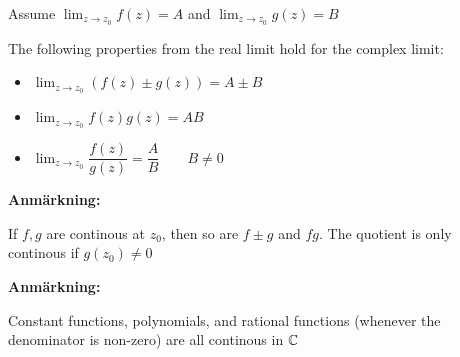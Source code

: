\par\bigskip
\noindent Assume $\lim_{z\to z_0} f(z) = A$ and $\lim_{z\to z_0}g(z) = B$\par
\noindent The following properties from the real limit hold for the complex limit:\par
\begin{itemize}
  \item $\lim_{z\to z_0}(f(z)\pm g(z)) = A\pm B$
  \item $\lim_{z\to z_0} f(z)g(z) = AB$
  \item $\lim_{z\to z_0}\dfrac{f(z)}{g(z)} = \dfrac{A}{B}\qquad B\neq0$
\end{itemize}
\par\bigskip
\noindent\textbf{Anmärkning:}\par
\noindent If $f,g$ are continous at $z_0$, then so are $f\pm g$ and $fg$. The quotient is only continous if $g(z_0)\neq0$
\par\bigskip
\noindent\textbf{Anmärkning:}\par
\noindent Constant functions, polynomials, and rational functions (whenever the denominator is non-zero) are all continous in $\mathbb{C}$
\par\bigskip

